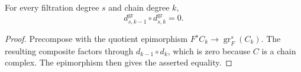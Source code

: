 \begin{theorem}
  \leanok
  \label{thm:core-associated-graded-differential-sq}
  For every filtration degree $s$ and chain degree $k$,
  \[
    d^{\operatorname{gr}}_{s,k-1}\circ
    d^{\operatorname{gr}}_{s,k}=0.
  \]
\end{theorem}

\begin{proof}
  \leanok
  Precompose with the quotient epimorphism $F^sC_k\longrightarrow
  \operatorname{gr}^s_F(C_k)$.  The resulting composite factors through
  $d_{k-1}\circ d_k$, which is zero because $C$ is a chain complex.  The
  epimorphism then gives the asserted equality.
\end{proof}
